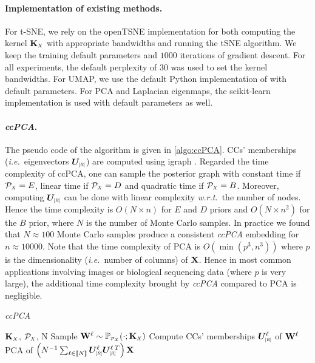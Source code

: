 \paragraph{Implementation of existing methods.} For t-SNE, we rely on the openTSNE implementation \citep{polivcar2019opentsne} for both computing the kernel $\mK_{\scaleto{X}{4pt}}$ with appropriate bandwidths and running the tSNE algorithm. We keep the training default parameters and $1000$ iterations of gradient descent. For all experiments, the default perplexity of $30$ was used to set the kernel bandwidths. For UMAP, we use the default Python implementation of \citep{mcinnes2018umap} with default parameters. For PCA and Laplacian eigenmaps, the scikit-learn implementation is used \citep{pedregosa2011scikit} with default parameters as well. 

\paragraph{\textit{ccPCA}.} The pseudo code of the algorithm is given in \cref{algo:ccPCA}. CCs' memberships (\textit{i.e.}\ eigenvectors $\bm{U}_{\scaleto{[R]}{5pt}}$) are computed using igraph \citep{csardi2006igraph}. Regarded the time complexity of ccPCA, one can sample the posterior graph with constant time if $\mathcal{P}_{\scaleto{X}{4pt}} = E$, linear time if $\mathcal{P}_{\scaleto{X}{4pt}} = D$ and quadratic time if $\mathcal{P}_{\scaleto{X}{4pt}} = B$. Moreover, computing $\bm{U}_{\scaleto{[R]}{5pt}}$ can be done with linear complexity \textit{w.r.t.}\ the number of nodes. Hence the time complexity is $O(N \times n)$ for $E$ and $D$ priors and $O(N \times n^2)$ for the $B$ prior, where $N$ is the number of Monte Carlo samples. In practice we found that $N\approx 100$ Monte Carlo samples produce a consistent \textit{ccPCA} embedding for $n \approx 10000$. Note that the time complexity of PCA is $O(\min(p^3,n^3))$ where $p$ is the dimensionality (\textit{i.e.}\ number of columns) of $\mathbf{X}$. Hence in most common applications involving images or biological sequencing data (where $p$ is very large), the additional time complexity brought by \textit{ccPCA} compared to PCA is negligible.

\vspace{0.5cm}

\begin{algorithm}[H]
  \caption{\textit{ccPCA}}
  \label{alg:3CPCA}
\begin{algorithmic}
   $\mK_{\scaleto{X}{4pt}}$, $\mathcal{P}_{\scaleto{X}{4pt}}$, N
  \STATE Sample $\W^{\ell} \sim  \mathbb{P}_{\scaleto{\mathcal{P}_{\scaleto{X}{4pt}}}{5pt}}(\cdot ; \mK_{\scaleto{X}{4pt}})$
  \STATE Compute CCs' memberships $\bm{U}^{\ell}_{\scaleto{[R]}{5pt}}$ of $\mathbf{W}^{\ell}$
  \ENDFOR
   PCA of $\left(N^{-1}\sum_{\ell \in \integ{N}} \bm{U}^{\ell}_{\scaleto{[R]}{5pt}} \bm{U}_{\scaleto{[R]}{5pt}}^{\ell\:T} \right) \X$
\end{algorithmic}
\label{algo:ccPCA}
\end{algorithm}


